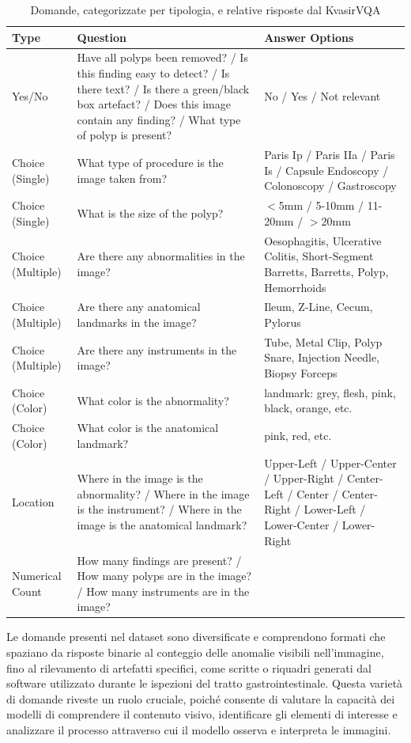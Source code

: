 \documentclass[../main.tex]{subfiles}
\begin{document}
\begin{table}[H]
\centering
\begin{tabular}{|>{\centering\arraybackslash}p{3cm}|>{\centering\arraybackslash}p{6cm}|>{\centering\arraybackslash}p{5cm}|}
\hline
\textbf{Type} & \textbf{Question} & \textbf{Answer Options} \\ \hline
Yes/No & Have all polyps been removed? / Is this finding easy to detect? / Is there text? / Is there a green/black box artefact? / Does this image contain any finding? / What type of polyp is present? & No / Yes / Not relevant \\ \hline
Choice (Single)  & What type of procedure is the image taken from? & Paris Ip / Paris IIa / Paris Is / Capsule Endoscopy / Colonoscopy / Gastroscopy \\ \hline 
Choice (Single)  & What is the size of the polyp? & $<$5mm / 5-10mm / 11-20mm / $>$20mm \\ \hline 
Choice (Multiple) & Are there any abnormalities in the image? & Oesophagitis, Ulcerative Colitis, Short-Segment Barretts, Barretts, Polyp, Hemorrhoids \\ \hline
Choice (Multiple) & Are there any anatomical landmarks in the image? & Ileum, Z-Line, Cecum, Pylorus \\  \hline
Choice (Multiple) & Are there any instruments in the image? & Tube, Metal Clip, Polyp Snare, Injection Needle, Biopsy Forceps \\ \hline
Choice (Color) & What color is the abnormality? & landmark: grey, flesh, pink, black, orange, etc. \\ \hline
Choice (Color) & What color is the anatomical landmark? & pink, red, etc. \\ \hline
Location & Where in the image is the abnormality? / Where in the image is the instrument? / Where in the image is the anatomical landmark? & Upper-Left / Upper-Center / Upper-Right / Center-Left / Center / Center-Right / Lower-Left / Lower-Center / Lower-Right \\ \hline
Numerical Count & How many findings are present? / How many polyps are in the image? / How many instruments are in the image? & [0-inf] \\ \hline
\end{tabular}
\caption{Domande, categorizzate per tipologia, e relative risposte dal KvasirVQA\cite{gautam2024kvasirvqa}}
\label{tab:question_types}
\end{table}

Le domande presenti nel dataset sono diversificate e comprendono formati che spaziano da risposte binarie al conteggio delle anomalie visibili nell'immagine, fino al rilevamento di artefatti specifici, come scritte o riquadri generati dal software utilizzato durante le ispezioni del tratto gastrointestinale. Questa varietà di domande riveste un ruolo cruciale, poiché consente di valutare la capacità dei modelli di comprendere il contenuto visivo, identificare gli elementi di interesse e analizzare il processo attraverso cui il modello osserva e interpreta le immagini.
\end{document}
